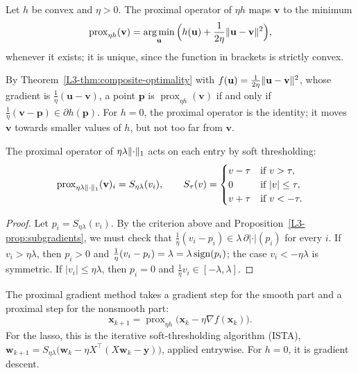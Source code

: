 \begin{definition}\label{L3-def:prox}
    Let $h$ be convex and $\eta > 0$. The proximal operator of $\eta h$ maps $\mathbf{v}$ to the minimum
    \[\operatorname{prox}_{\eta h}(\mathbf{v}) = \operatorname*{arg\,min}_{\mathbf{u}} \Big(h(\mathbf{u}) + \frac{1}{2\eta}\lVert \mathbf{u} - \mathbf{v} \rVert^2\Big),\]
    whenever it exists; it is unique, since the function in brackets is strictly convex.
\end{definition}

By Theorem~\ref{L3-thm:composite-optimality} with $f(\mathbf{u}) = \frac{1}{2\eta}\lVert \mathbf{u} - \mathbf{v} \rVert^2$, whose gradient is $\frac{1}{\eta}(\mathbf{u} - \mathbf{v})$, a point $\mathbf{p}$ is $\operatorname{prox}_{\eta h}(\mathbf{v})$ if and only if $\frac{1}{\eta}(\mathbf{v} - \mathbf{p}) \in \partial h(\mathbf{p})$. For $h = 0$, the proximal operator is the identity; it moves $\mathbf{v}$ towards smaller values of $h$, but not too far from $\mathbf{v}$.

\begin{proposition}\label{L3-prop:soft-threshold}
    The proximal operator of $\eta\lambda\lVert \cdot \rVert_1$ acts on each entry by soft thresholding:
    \[\operatorname{prox}_{\eta\lambda\lVert \cdot \rVert_1}(\mathbf{v})_i = S_{\eta\lambda}(v_i), \qquad S_\tau(v) = \begin{cases} v - \tau & \text{if } v > \tau, \\ 0 & \text{if } |v| \leq \tau, \\ v + \tau & \text{if } v < -\tau. \end{cases}\]
\end{proposition}

\begin{proof}
    Let $p_i = S_{\eta\lambda}(v_i)$. By the criterion above and Proposition~\ref{L3-prop:subgradients}, we must check that $\frac{1}{\eta}(v_i - p_i) \in \lambda\,\partial|\cdot|(p_i)$ for every $i$. If $v_i > \eta\lambda$, then $p_i > 0$ and $\frac{1}{\eta}(v_i - p_i) = \lambda = \lambda\operatorname{sign}(p_i)$; the case $v_i < -\eta\lambda$ is symmetric. If $|v_i| \leq \eta\lambda$, then $p_i = 0$ and $\frac{1}{\eta}v_i \in [-\lambda, \lambda]$.
\end{proof}

The proximal gradient method takes a gradient step for the smooth part and a proximal step for the nonsmooth part:
\[\mathbf{x}_{k+1} = \operatorname{prox}_{\eta h}\big(\mathbf{x}_k - \eta\nabla f(\mathbf{x}_k)\big).\]
For the lasso, this is the iterative soft-thresholding algorithm (ISTA), $\mathbf{w}_{k+1} = S_{\eta\lambda}\big(\mathbf{w}_k - \eta X^\top(X\mathbf{w}_k - \mathbf{y})\big)$, applied entrywise. For $h = 0$, it is gradient descent.

